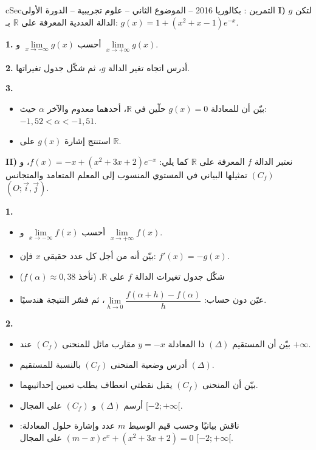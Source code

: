 \documentclass[12pt,a4paper]{article}
\newenvironment{BOX}[2]{\begin{otherlanguage}{english}\begin{arbox}{#1}{#2}}{\end{arbox}\end{otherlanguage}}
\newcounter{exo}
\newenvironment{tamrin}[1]{\stepcounter{exo}\begin{BOX}{cSec}{التمرين \theexo: #1}}{\end{BOX}}
\newcommand{\R}{\mathbb{R}}
\newenvironment{sq}{\begin{itemize}[leftmargin=2.4em,itemsep=3pt]}{\end{itemize}}
\newcommand{\qa}{\item[(أ)]}\newcommand{\qb}{\item[(ب)]}\newcommand{\qc}{\item[(جـ)]}\newcommand{\qd}{\item[(د)]}\newcommand{\qe}{\item[(هـ)]}
\newcommand{\QQ}[1]{\par\smallskip\textbf{#1.} }
\begin{document}
\begin{tamrin}{بكالوريا 2016 -- الموضوع الثاني -- علوم تجريبية -- الدورة الأولى}
\textbf{I)} لتكن $g$ الدالة العددية المعرفة على $\R$ بـ: $g(x)=1+(x^2+x-1)e^{-x}$.

\QQ{1} أحسب $\lim\limits_{x\to-\infty}g(x)$ و $\lim\limits_{x\to+\infty}g(x)$.
\QQ{2} أدرس اتجاه تغير الدالة $g$، ثم شكّل جدول تغيراتها.
\QQ{3}
\begin{sq}
\qa بيّن أن للمعادلة $g(x)=0$ حلّين في $\R$، أحدهما معدوم والآخر $\alpha$ حيث: $-1{,}52<\alpha<-1{,}51$.
\qb استنتج إشارة $g(x)$ على $\R$.
\end{sq}

\textbf{II)} نعتبر الدالة $f$ المعرفة على $\R$ كما يلي: $f(x)=-x+(x^2+3x+2)e^{-x}$، و $(C_f)$ تمثيلها البياني في المستوي المنسوب إلى المعلم المتعامد والمتجانس $(O;\vec i,\vec j)$.

\QQ{1}
\begin{sq}
\qa أحسب $\lim\limits_{x\to-\infty}f(x)$ و $\lim\limits_{x\to+\infty}f(x)$.
\qb بيّن أنه من أجل كل عدد حقيقي $x$ فإن: $f'(x)=-g(x)$.
\qc شكّل جدول تغيرات الدالة $f$ على $\R$. (نأخذ $f(\alpha)\approx0{,}38$)
\qd عيّن دون حساب: $\lim\limits_{h\to0}\dfrac{f(\alpha+h)-f(\alpha)}{h}$، ثم فسّر النتيجة هندسيًا.
\end{sq}
\QQ{2}
\begin{sq}
\qa بيّن أن المستقيم $(\Delta)$ ذا المعادلة $y=-x$ مقارب مائل للمنحنى $(C_f)$ عند $+\infty$.
\qb أدرس وضعية المنحنى $(C_f)$ بالنسبة للمستقيم $(\Delta)$.
\qc بيّن أن المنحنى $(C_f)$ يقبل نقطتي انعطاف يطلب تعيين إحداثييهما.
\qd أرسم $(\Delta)$ و $(C_f)$ على المجال $[-2;+\infty[$.
\qe ناقش بيانيًا وحسب قيم الوسيط $m$ عدد وإشارة حلول المعادلة: $(m-x)e^x+(x^2+3x+2)=0$ على المجال $[-2;+\infty[$.
\end{sq}
\end{tamrin}
\end{document}
